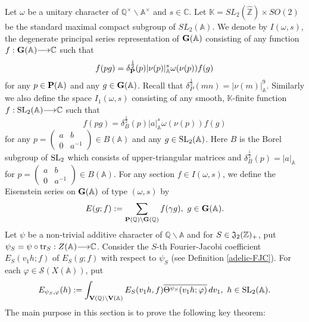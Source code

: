 \documentclass[11pt]{amsart}
\numberwithin{equation}{section}
\theoremstyle{definition}
\begin{document}
Let $\omega$ be a unitary character of ${\mathbb{Q}}^\times\backslash{\mathbb{A}}^\times$ and $s\in {\mathbb{C}}$. 
Let $\mathbb{K}=SL_2(\widehat{\mathbb{Z}})\times SO(2)$ be the standard maximal compact subgroup of $SL_2({\mathbb{A}})$. 
We denote by $I(\omega,s)$, the degenerate principal series representation of $\bold{G}({\mathbb{A}})$ consisting of any  
function $f:\bold{G}({\mathbb{A}}){\longrightarrow} {\mathbb{C}}$ such that 
$$f(pg)=\delta^{\frac{1}{2}}_{\bold P}(p)|\nu(p)|^s_{\mathbb{A}}\omega(\nu(p))f(g)$$
 for any  $p\in \bold P({\mathbb{A}})$ and any  $g\in \bold{G}({\mathbb{A}})$. Recall that $\delta^{\frac{1}{2}}_P(mn)=|\nu(m)|^9_{\mathbb{A}}$. 
Similarly we also define  the space $I_1(\omega,s)$  consisting of any smooth, $\mathbb{K}$-finite 
function $f:{\rm SL}_2({\mathbb{A}}){\longrightarrow} {\mathbb{C}}$ such that 
$$f(pg)=\delta^{\frac{1}{2}}_B(p)|a|^s_{\mathbb{A}}\omega(\nu(p))f(g)$$
 for any  $p=
\left(\begin{array}{cc}
a & b \\
0 & a^{-1} 
\end{array}
\right)\in B({\mathbb{A}})$ and any  $g\in {\rm SL}_2({\mathbb{A}})$. 
Here $B$ is the Borel subgroup of ${\rm SL}_2$ which consists of upper-triangular matrices and 
$\delta^{\frac{1}{2}}_B(p)=|a|_{\mathbb{A}}$ for $p=
\left(\begin{array}{cc}
a & b \\
0 & a^{-1} 
\end{array}
\right)\in B({\mathbb{A}})
$.    
For any section $f\in I(\omega,s)$, we define the Eisenstein series on $\bold{G}({\mathbb{A}})$ of type $(\omega,s)$ by 
$$E(g;f):=\sum_{\bold P({\mathbb{Q}}){\backslash} \bold{G}({\mathbb{Q}})}f(\gamma g),\ g\in \bold{G}({\mathbb{A}}).$$
Let $\psi$ be a non-trivial additive character of ${\mathbb{Q}}{\backslash}{\mathbb{A}}$ and 
for $S\in \frak J_2({\mathbb{Z}})_{+}$, put $\psi_S=\psi\circ {\rm tr}_S:Z({\mathbb{A}}){\longrightarrow} {\mathbb{C}}$. 
Consider the $S$-th Fourier-Jacobi coefficient $E_S(v_1h;f)$ of $E_S(g;f)$ with respect to $\psi_S$ (see Definition \ref{adelic-FJC}). 
For each $\varphi\in \mathcal{S}(X({\mathbb{A}}))$, put 
\begin{equation}\label{Fourier-Jacobi}
E_{\psi_S,\varphi}(h):=\int_{\bold V({\mathbb{Q}})\backslash \bold V({\mathbb{A}})} E_S(v_1h,f)\overline{\Theta^{\psi_S}(v_1h;\varphi)}\, dv_1,\ h\in {\rm SL}_2({\mathbb{A}}).
\end{equation}
The main purpose in this section is to prove the following key theorem:
\end{document}
